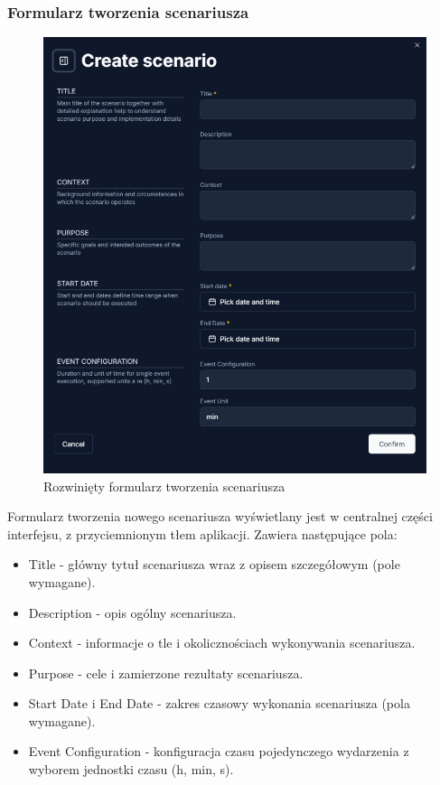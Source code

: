 \subsubsection{Formularz tworzenia scenariusza}
\begin{figure}[h]
    \centering
    \includegraphics[width=\textwidth]{resources/local/04-implementacja/frontend/landing/create-scenario-form}
    \caption{Rozwinięty formularz tworzenia scenariusza}
    \label{fig:create_scenario}
\end{figure}
Formularz tworzenia nowego scenariusza wyświetlany jest w centralnej części interfejsu, z przyciemnionym tłem aplikacji. Zawiera następujące pola:
\begin{itemize}
    \item Title - główny tytuł scenariusza wraz z opisem szczegółowym (pole wymagane).
    \item Description - opis ogólny scenariusza.
    \item Context - informacje o tle i okolicznościach wykonywania scenariusza.
    \item Purpose - cele i zamierzone rezultaty scenariusza.
    \item Start Date i End Date - zakres czasowy wykonania scenariusza (pola wymagane).
    \item Event Configuration - konfiguracja czasu pojedynczego wydarzenia z wyborem jednostki czasu (h, min, s).
\end{itemize}
